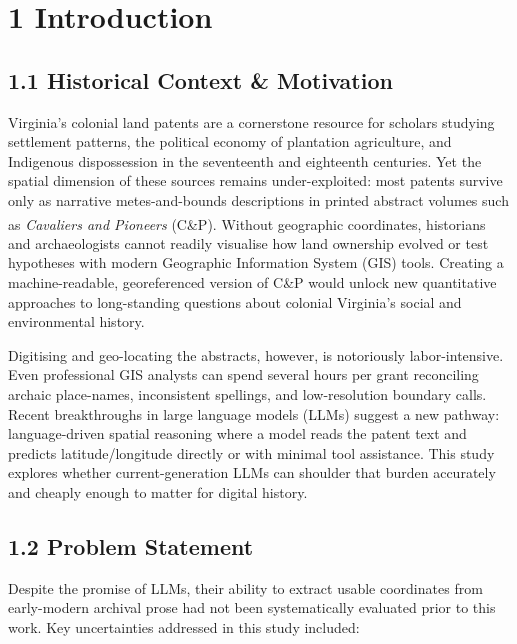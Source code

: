 \documentclass[
  10pt]{article}
\begin{document}
\section{1 Introduction}\label{introduction}

\subsection{1.1 Historical Context \&
Motivation}\label{historical-context-motivation}

Virginia's colonial land patents are a cornerstone resource for scholars
studying settlement patterns, the political economy of plantation
agriculture, and Indigenous dispossession in the seventeenth and
eighteenth centuries. Yet the spatial dimension of these sources remains
under-exploited: most patents survive only as narrative metes-and-bounds
descriptions in printed abstract volumes such as \emph{Cavaliers and
Pioneers}
(C\&P)\textsuperscript{}. Without
geographic coordinates, historians and archaeologists cannot readily
visualise how land ownership evolved or test hypotheses with modern
Geographic Information System (GIS) tools. Creating a machine-readable,
georeferenced version of C\&P would unlock new quantitative approaches
to long-standing questions about colonial Virginia's social and
environmental history.

Digitising and geo-locating the abstracts, however, is notoriously
labor-intensive. Even professional GIS analysts can spend several hours
per grant reconciling archaic place-names, inconsistent spellings, and
low-resolution boundary calls. Recent breakthroughs in large language
models (LLMs) suggest a new pathway: language-driven spatial reasoning
where a model reads the patent text and predicts latitude/longitude
directly or with minimal tool assistance. This study explores whether
current-generation LLMs can shoulder that burden accurately and cheaply
enough to matter for digital history.

\subsection{1.2 Problem Statement}\label{problem-statement}

Despite the promise of LLMs, their ability to extract usable coordinates
from early-modern archival prose had not been systematically evaluated
prior to this work. Key uncertainties addressed in this study included:
\end{document}
